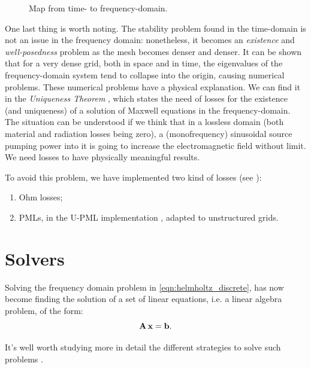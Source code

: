 \begin{figure}[htbp]
  \begin{center}
    \resizebox{11cm}{!}{}
  \end{center}
  \caption{Map from time- to frequency-domain.}
  \label{fig:stability_td_vs_fd}
\end{figure}

One last thing is worth noting. The stability problem found in the
time-domain is not an issue in the frequency domain: nonetheless, it
becomes an \emph{existence} and \emph{well-posedness} problem as the
mesh becomes denser and denser. It can be shown \cite{bolla_piers}
that for a very dense grid, both in space and in time, the eigenvalues
of the frequency-domain system tend to collapse into the origin,
causing numerical problems. These numerical problems have a physical
explanation. We can find it in the \emph{Uniqueness Theorem}
\cite{someda_electromagnetic}, which states the need of losses for the
existence (and uniqueness) of a solution of Maxwell equations in the
frequency-domain. The situation can be understood if we think that in
a lossless domain (both material and radiation losses being zero), a
(monofrequency) sinusoidal source pumping power into it is going to
increase the electromagnetic field without limit. We need losses to
have physically meaningful results.

To avoid this problem, we have implemented two kind of losses (see
):
\begin{enumerate}
\item
  Ohm losses;
\item
  PMLs, in the U-PML implementation \cite{taflove_computational}, adapted to unstructured
  grids.
\end{enumerate}

\section{Solvers}

Solving the frequency domain problem in
\eqref{eqn:helmholtz_discrete}, has now become finding the
solution of a set of linear equations, i.e. a linear algebra
problem, of the form:
\begin{equation} \label{eqn:linear_system}
  {\mathbf{A}\,\mathbf{x}} = \mathbf{b} .
\end{equation}

It's well worth studying more in detail the different
strategies to solve such problems \cite{numerical_recipies}.

